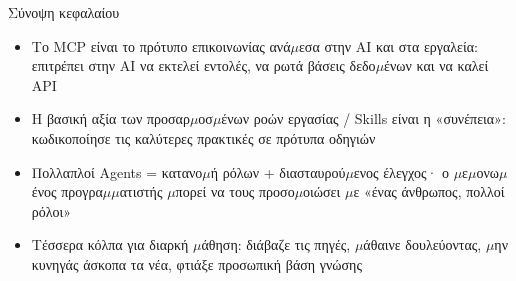 \begin{tcbsummary}{Σύνοψη κεφαλαίου}
\begin{itemize}
  \item Το MCP είναι το πρότυπο επικοινωνίας ανά$\mu$εσα στην AI και στα εργαλεία: επιτρέπει στην AI να εκτελεί εντολές, να ρωτά βάσεις δεδο$\mu$ένων και να καλεί API
  \item Η βασική αξία των προσαρ$\mu$οσ$\mu$ένων ροών εργασίας / Skills είναι η «συνέπεια»: κωδικοποίησε τις καλύτερες πρακτικές σε πρότυπα οδηγιών
  \item Πολλαπλοί Agents = κατανο$\mu$ή ρόλων + διασταυρού$\mu$ενος έλεγχος· ο $\mu$ε$\mu$ονω$\mu$ένος προγρα$\mu$$\mu$ατιστής $\mu$πορεί να τους προσο$\mu$οιώσει $\mu$ε «ένας άνθρωπος, πολλοί ρόλοι»
  \item Τέσσερα κόλπα για διαρκή $\mu$άθηση: διάβαζε τις πηγές, $\mu$άθαινε δουλεύοντας, $\mu$ην κυνηγάς άσκοπα τα νέα, φτιάξε προσωπική βάση γνώσης
\end{itemize}

\end{tcbsummary}
